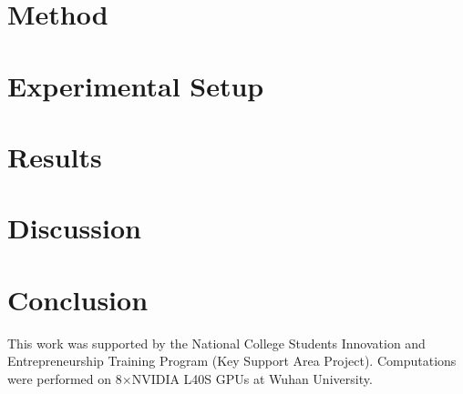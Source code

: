 \documentclass[twocolumn,superscriptaddress,prb,floatfix]{revtex4-2}
\begin{document}
\section{Method}\label{sec:method}


\section{Experimental Setup}\label{sec:setup}


\section{Results}\label{sec:results}


\section{Discussion}\label{sec:discussion}


\section{Conclusion}\label{sec:conclusion}


\begin{acknowledgments}
This work was supported by the National College Students Innovation and
Entrepreneurship Training Program (Key Support Area Project).
Computations were performed on 8$\times$NVIDIA L40S GPUs at Wuhan University.
\end{acknowledgments}


\end{document}

